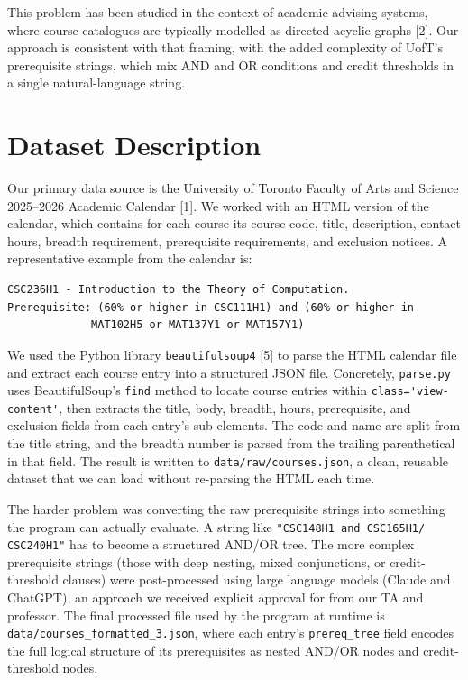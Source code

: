 \documentclass[11pt]{article}
\begin{document}
This problem has been studied in the context of academic advising systems, where course
catalogues are typically modelled as directed acyclic graphs [2]. Our approach is consistent
with that framing, with the added complexity of UofT's prerequisite strings, which mix AND
and OR conditions and credit thresholds in a single natural-language string.

\section*{Dataset Description}

Our primary data source is the University of Toronto Faculty of Arts and Science 2025--2026
Academic Calendar [1]. We worked with an HTML version of the calendar, which contains for
each course its course code, title, description, contact hours, breadth requirement,
prerequisite requirements, and exclusion notices. A representative example from the calendar
is:

\begin{verbatim}
CSC236H1 - Introduction to the Theory of Computation.
Prerequisite: (60% or higher in CSC111H1) and (60% or higher in
             MAT102H5 or MAT137Y1 or MAT157Y1)
\end{verbatim}

We used the Python library \verb|beautifulsoup4| [5] to parse the HTML calendar file and
extract each course entry into a structured JSON file. Concretely, \verb|parse.py| uses
BeautifulSoup's \verb|find| method to locate course entries within \verb|class='view-content'|,
then extracts the title, body, breadth, hours, prerequisite, and exclusion fields from each
entry's sub-elements. The code and name are split from the title string, and the breadth
number is parsed from the trailing parenthetical in that field. The result is written to
\verb|data/raw/courses.json|, a clean, reusable dataset that we can load without
re-parsing the HTML each time.

The harder problem was converting the raw prerequisite strings into something the program can
actually evaluate. A string like \verb|"CSC148H1 and CSC165H1/ CSC240H1"| has to become a
structured AND/OR tree. The more complex prerequisite strings (those with deep nesting,
mixed conjunctions, or credit-threshold clauses) were post-processed using large language
models (Claude and ChatGPT), an approach we received explicit approval for from our TA and
professor. The final processed file used by the program at runtime is
\verb|data/courses_formatted_3.json|, where each entry's \verb|prereq_tree| field encodes
the full logical structure of its prerequisites as nested AND/OR nodes and credit-threshold
nodes.
\end{document}
